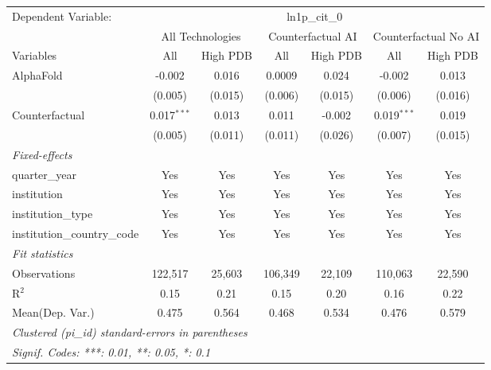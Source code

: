 \begingroup
\centering
\begin{tabular}{lcccccc}
   \tabularnewline \midrule \midrule
   Dependent Variable: & \multicolumn{6}{c}{ln1p\_cit\_0}\\
 & \multicolumn{2}{c}{All Technologies} & \multicolumn{2}{c}{Counterfactual AI} & \multicolumn{2}{c}{Counterfactual No AI} \\
\cmidrule(lr){1-1}\cmidrule(lr){2-3} \cmidrule(lr){4-5} \cmidrule(lr){6-7}
Variables & \multicolumn{1}{c}{All} & \multicolumn{1}{c}{High PDB} & \multicolumn{1}{c}{All} & \multicolumn{1}{c}{High PDB} & \multicolumn{1}{c}{All} & \multicolumn{1}{c}{High PDB} \\
\cmidrule(lr){1-1}\cmidrule(lr){2-2} \cmidrule(lr){3-3} \cmidrule(lr){4-4} \cmidrule(lr){5-5} \cmidrule(lr){6-6} \cmidrule(lr){7-7}
   AlphaFold                    & -0.002        & 0.016   & 0.0009  & 0.024   & -0.002        & 0.013\\   
                                & (0.005)       & (0.015) & (0.006) & (0.015) & (0.006)       & (0.016)\\   
   Counterfactual               & 0.017$^{***}$ & 0.013   & 0.011   & -0.002  & 0.019$^{***}$ & 0.019\\   
                                & (0.005)       & (0.011) & (0.011) & (0.026) & (0.007)       & (0.015)\\   
   \midrule
   \emph{Fixed-effects}\\
   quarter\_year                & Yes           & Yes     & Yes     & Yes     & Yes           & Yes\\  
   institution                  & Yes           & Yes     & Yes     & Yes     & Yes           & Yes\\  
   institution\_type            & Yes           & Yes     & Yes     & Yes     & Yes           & Yes\\  
   institution\_country\_code   & Yes           & Yes     & Yes     & Yes     & Yes           & Yes\\  
   \midrule
   \emph{Fit statistics}\\
   Observations                 & 122,517       & 25,603  & 106,349 & 22,109  & 110,063       & 22,590\\  
   R$^2$                        & 0.15          & 0.21    & 0.15    & 0.20    & 0.16          & 0.22\\  
Mean(Dep. Var.) & 0.475 & 0.564 & 0.468 & 0.534 & 0.476 & 0.579 \\
   \midrule \midrule
   \multicolumn{7}{l}{\emph{Clustered (pi\_id) standard-errors in parentheses}}\\
   \multicolumn{7}{l}{\emph{Signif. Codes: ***: 0.01, **: 0.05, *: 0.1}}\\
\end{tabular}
\par\endgroup
